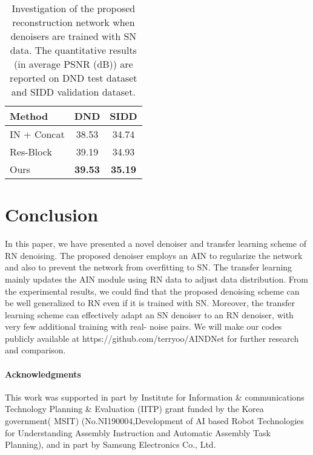 \documentclass[10pt,twocolumn,letterpaper]{article}
\begin{document}
\begin{table}[t]
	\centering	
	\caption{Investigation of the proposed reconstruction network when denoisers are trained with SN data. The quantitative results (in average PSNR (dB))  are reported on DND test dataset and SIDD validation dataset.}
	\label{table:reconstruction}
	\begin{adjustbox}{width=0.55\linewidth}
		\begin{tabular}{lcc}
			\toprule
			Method   & DND & SIDD \\
			\midrule			
			IN + Concat & 38.53 & 34.74 \\
			Res-Block~\cite{kim2019adaptively} & 39.19 & 34.93 \\
			Ours & \textbf{39.53} & \textbf{35.19} \\			
			\bottomrule			
		\end{tabular}
	\end{adjustbox}
\end{table}  


\section{Conclusion}
In this paper, we have presented a novel denoiser and transfer learning scheme of RN denoising. The proposed denoiser employs an AIN to regularize the network and also to prevent the network from overfitting to SN. The transfer learning mainly updates the AIN module using RN data to adjust data distribution. From the experimental results, we could find that the proposed denoising scheme can be well generalized to RN even if it is trained with SN.
Moreover, the transfer learning scheme can effectively adapt an SN denoiser to an RN denoiser, with very few additional training with real- noise pairs. We will make our codes publicly available at https://github.com/terryoo/AINDNet for further research and comparison.

\paragraph{Acknowledgments}
This work was supported in part by Institute
for Information \& communications Technology Planning
\& Evaluation (IITP) grant funded by the Korea government(
MSIT) (No.NI190004,Development of AI based
Robot Technologies for Understanding Assembly Instruction
and Automatic Assembly Task Planning), and in part
by Samsung Electronics Co., Ltd.
\end{document}
